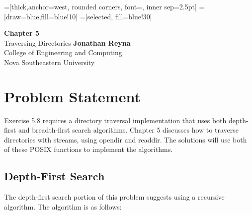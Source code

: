 \documentclass[12pt,sffamily]{article}
\begin{document}
=[thick,anchor=west, rounded corners, font={\scriptsize\ttfamily}, inner sep=2.5pt]
=[draw=blue,fill=blue!10]
=[selected, fill=blue!30]

\begin{titlepage}
    \begin{center}
        \vspace*{1cm}
        \Huge
        \textbf{Chapter 5}\\
        \vspace{0.5cm}
        \LARGE
        Traversing Directories
        \vfill
        \Large
        \textbf{Jonathan Reyna}\\
        College of Engineering and Computing\\
        Nova Southeastern University\\
        \usdate{\today}
    \end{center}
\end{titlepage}

\section{Problem Statement}
Exercise 5.8 requires a directory traversal implementation that uses both depth-first and breadth-first search algorithms. Chapter 5 discusses how to traverse directories with streams, using opendir and readdir. The solutions will use both of these POSIX functions to implement the algorithms.
\subsection{Depth-First Search}
The depth-first search portion of this problem suggests using a recursive algorithm. The algorithm is as follows:\\
\end{document}
